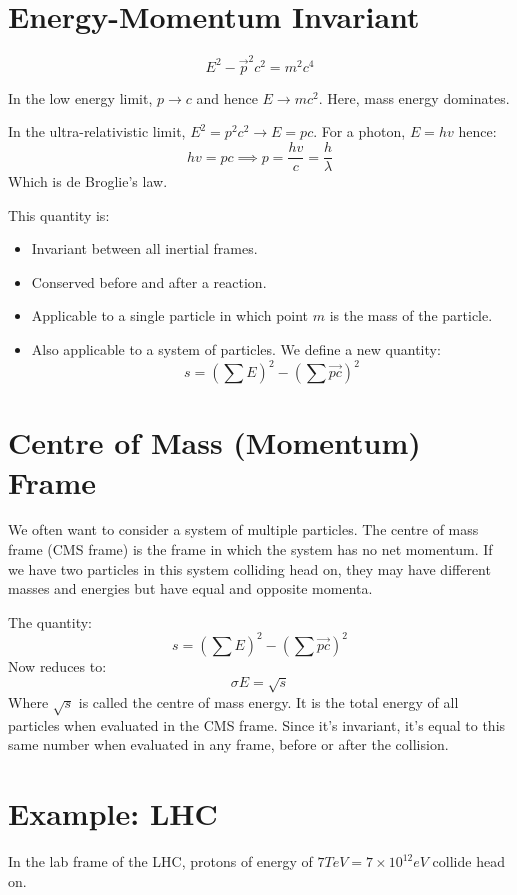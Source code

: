 
\section{Energy-Momentum Invariant}
\[
    \boxed{E^2 - \vec{p}^2 c^2 = m^2 c^4}
\]

In the low energy limit, $p \to c$ and hence $E \to mc^2$. Here, mass energy dominates.

In the ultra-relativistic limit, $E^2 = p^2 c^2 \to E = pc$. For a photon, $E = hv$ hence:
\[
    hv = pc \implies p = \frac{hv}{c} = \frac{h}{\lambda}
\]
Which is de Broglie's law.

This quantity is:
\begin{itemize}
    \item Invariant between all inertial frames.
    \item Conserved before and after a reaction.
    \item Applicable to a single particle in which point $m$ is the mass of the particle.
    \item Also applicable to a system of particles. We define a new quantity:
    \[
        s = \left(\sum E\right)^2 - \left(\sum \vec{pc}\right)^2
    \]
\end{itemize}

\section{Centre of Mass (Momentum) Frame}
We often want to consider a system of multiple particles. The centre of mass frame (CMS frame) is the frame in which the system has no net momentum. If we have two particles in this system colliding head on, they may have different masses and energies but have equal and opposite momenta. 

The quantity:
\[
    s = \left(\sum E\right)^2 - \left(\sum \vec{pc}\right)^2
\]
Now reduces to:
\[
    \sigma E = \sqrt{s}
\]
Where $\sqrt{s}$ is called the centre of mass energy. It is the total energy of all particles when evaluated in the CMS frame. Since it's invariant, it's equal to this same number when evaluated in any frame, before or after the collision.

\section{Example: LHC}
In the lab frame of the LHC, protons of energy of $7 \si{TeV} = 7 \times 10^{12}\si{eV}$ collide head on.

